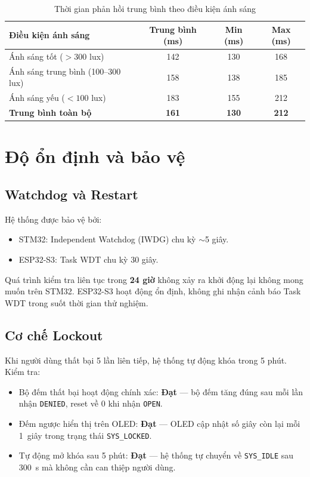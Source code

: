\begin{table}[H]
  \centering
  \caption{Thời gian phản hồi trung bình theo điều kiện ánh sáng}
  \label{tab:latency_results}
  \begin{tabular}{l c c c}
    \toprule
    \textbf{Điều kiện ánh sáng} & \textbf{Trung bình (ms)} & \textbf{Min (ms)} & \textbf{Max (ms)} \\
    \midrule
    Ánh sáng tốt ($>300$ lux)         & 142 & 130 & 168 \\
    Ánh sáng trung bình (100--300 lux) & 158 & 138 & 185 \\
    Ánh sáng yếu ($<100$ lux)         & 183 & 155 & 212 \\
    \midrule
    \textbf{Trung bình toàn bộ}        & \textbf{161} & \textbf{130} & \textbf{212} \\
    \bottomrule
  \end{tabular}
\end{table}

\section{Độ ổn định và bảo vệ}
\label{sec:stability}

\subsection{Watchdog và Restart}

Hệ thống được bảo vệ bởi:
\begin{itemize}
  \item STM32: Independent Watchdog (IWDG) chu kỳ $\sim$5 giây.
  \item ESP32-S3: Task WDT chu kỳ 30 giây.
\end{itemize}

Quá trình kiểm tra liên tục trong \textbf{24 giờ} không xảy ra khởi động lại không mong muốn trên STM32. ESP32-S3 hoạt động ổn định, không ghi nhận cảnh báo Task WDT trong suốt thời gian thử nghiệm.

\subsection{Cơ chế Lockout}

Khi người dùng thất bại 5 lần liên tiếp, hệ thống tự động khóa trong 5 phút. Kiểm tra:
\begin{itemize}
  \item Bộ đếm thất bại hoạt động chính xác: \textbf{Đạt} --- bộ đếm tăng đúng sau mỗi lần nhận \texttt{DENIED}, reset về 0 khi nhận \texttt{OPEN}.
  \item Đếm ngược hiển thị trên OLED: \textbf{Đạt} --- OLED cập nhật số giây còn lại mỗi 1~giây trong trạng thái \texttt{SYS\_LOCKED}.
  \item Tự động mở khóa sau 5 phút: \textbf{Đạt} --- hệ thống tự chuyển về \texttt{SYS\_IDLE} sau \SI{300}{s} mà không cần can thiệp người dùng.
\end{itemize}

